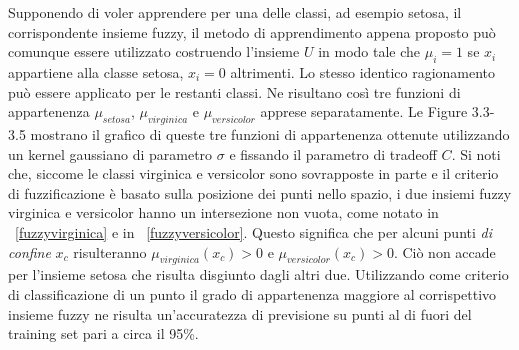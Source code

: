 \documentclass [11pt,a4paper,twoside,openright] {book}
\begin{document}
Supponendo di voler apprendere per una delle classi, ad esempio setosa, il corrispondente insieme fuzzy, il metodo di apprendimento appena proposto può comunque essere utilizzato costruendo l'insieme $U$ in modo tale che $\mu_i = 1$ se $x_i$ appartiene alla classe setosa, $x_i = 0$ altrimenti. Lo stesso identico ragionamento può essere applicato per le restanti classi. Ne risultano così tre funzioni di appartenenza $\mu_{setosa}$, $\mu_{virginica}$ e $\mu_{versicolor}$ apprese separatamente. Le Figure 3.3-3.5 mostrano il grafico di queste tre funzioni di appartenenza ottenute utilizzando un kernel gaussiano di parametro $\sigma$ e fissando il parametro di tradeoff $C$. Si noti che, siccome le classi virginica e versicolor sono sovrapposte in parte e il criterio di fuzzificazione è basato sulla posizione dei punti nello spazio, i due insiemi fuzzy virginica e versicolor hanno un intersezione non vuota, come notato in \figurename~\ref{fuzzyvirginica} e in \figurename~\ref{fuzzyversicolor}. Questo significa che per alcuni punti \textit{di confine} $x_c$ risulteranno $\mu_{virginica}(x_c) > 0$ e $\mu_{versicolor}(x_c) > 0$.  Ciò non accade per l'insieme setosa che risulta disgiunto dagli altri due. Utilizzando come criterio di classificazione di un punto il grado di appartenenza maggiore al corrispettivo insieme fuzzy ne risulta un'accuratezza di previsione su punti al di fuori del training set pari a circa il 95\%.
\end{document}
